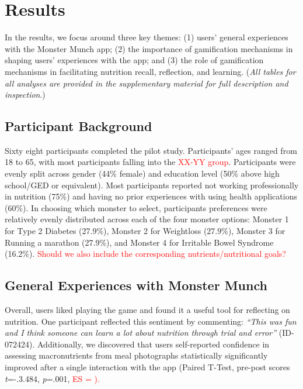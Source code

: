 \vspace{-5pt}
\section{Results}

In the results, we focus around three key themes: (1) users' general experiences with the Monster Munch app; (2) the importance of gamification mechanisms in shaping users' experiences with the app; and (3) the role of gamification mechanisms in facilitating nutrition recall, reflection, and learning. (\textit{All tables for all analyses are provided in the supplementary material for full description and inspection}.)




\vspace{-5pt}
\subsection{Participant Background}
Sixty eight participants completed the pilot study. Participants' ages ranged from 18 to 65, with most participants falling into the \textcolor{red}{XX-YY group}. Participants were evenly split across gender (44\% female) and education level (50\% above high school/GED or equivalent). Most participants reported not working professionally in nutrition (75\%) and having no prior experiences with using health applications (60\%). In choosing which monster to select, participants preferences were relatively evenly distributed across each of the four monster options: Monster 1 for Type 2 Diabetes (27.9\%), Monster 2 for Weightloss (27.9\%), Monster 3 for Running a marathon (27.9\%), and Monster 4 for Irritable Bowel Syndrome (16.2\%). \textcolor{red}{Should we also include the corresponding nutrients/nutritional goals?}
\vspace{-5pt}
\subsection{General Experiences with Monster Munch}

Overall, users liked playing the game and found it a useful tool for reflecting on nutrition. One participant reflected this sentiment by commenting: \textit{``This was fun and I think someone can learn a lot about nutrition through trial and error''} (ID-072424). Additionally, we discovered that users self-reported confidence in assessing macronutrients from meal photographs statistically significantly improved after a single interaction with the app (Paired T-Test, pre-post scores \textit{t}=-.3.484, \textit{p}=.001, \textcolor{red}{ES = ).} %
\vspace{-5pt}
